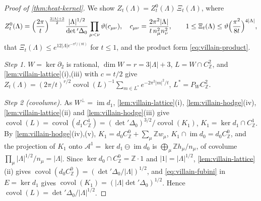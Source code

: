 \documentclass[11pt,a4paper]{amsart}
\theoremstyle{definition}
\theoremstyle{remark}
\numberwithin{equation}{section}
\newcommand{\Z}{\mathbb{Z}}          %
\newcommand{\abs}[1]{\lvert #1\rvert}      %
\begin{document}
\begin{proof}[Proof of \cref{thm:heat-kernel}]
We show $Z_t(\Lambda)=Z^0_t(\Lambda)\,\Xi_t(\Lambda)$, where
\begin{equation}\label{eq:villain-Z0}
Z^0_t(\Lambda)=\Bigl(\frac{2\pi}t\Bigr)^{\frac{3|\Lambda|+3}2}\frac{|\Lambda|^{1/2}}{\det{}'\Delta_0}\prod_{\mu<\nu}\vartheta(c_{\mu\nu}),\quad c_{\mu\nu}=\frac{2\pi^2|\Lambda|}{t\,n_\mu^2n_\nu^2},\qquad 1\le\Xi_t(\Lambda)\le\vartheta\Bigl(\frac{\pi^2}{8t}\Bigr)^{4|\Lambda|},
\end{equation}
that $\Xi_t(\Lambda)\le e^{12|\Lambda|e^{-\pi^2/(8t)}}$ for $t\le1$, and the product form \eqref{eq:villain-product}.

\emph{Step 1.} $W=\ker\partial_2$ is rational, $\dim W=r=3|\Lambda|+3$, $L=W\cap C^2_\Z$, and \cref{lem:villain-lattice}(i),(iii) with $c=t/2$ give $Z_t(\Lambda)=(2\pi/t)^{r/2}\operatorname{covol}(L)^{-1}\sum_{m\in L^*}e^{-2\pi^2\abs m^2/t}$, $L^*=P_WC^2_\Z$.

\emph{Step 2 (covolume).} As $W^\perp=\operatorname{im}d_1$, \cref{lem:villain-lattice}(i), \cref{lem:villain-hodge}(iv), \cref{lem:villain-lattice}(ii) and \cref{lem:villain-hodge}(iii) give $\operatorname{covol}(L)=\operatorname{covol}(d_1C^1_\Z)=(\det{}'\Delta_0)^{3/2}/\operatorname{covol}(K_1)$, $K_1=\ker d_1\cap C^1_\Z$. By \cref{lem:villain-hodge}(iv),(v), $K_1=d_0C^0_\Z+\sum_\mu\Z w_\mu$, $K_1\cap\operatorname{im}d_0=d_0C^0_\Z$, and the projection of $K_1$ onto $\mathcal A^1=\ker d_1\ominus\operatorname{im}d_0$ is $\bigoplus_\mu\Z h_\mu/n_\mu$, of covolume $\prod_\mu|\Lambda|^{1/2}/n_\mu=|\Lambda|$. Since $\ker d_0\cap C^0_\Z=\Z\cdot1$ and $\abs1=|\Lambda|^{1/2}$, \cref{lem:villain-lattice}(ii) gives $\operatorname{covol}(d_0C^0_\Z)=(\det{}'\Delta_0/|\Lambda|)^{1/2}$, and \eqref{eq:villain-fubini} in $E=\ker d_1$ gives $\operatorname{covol}(K_1)=(|\Lambda|\det{}'\Delta_0)^{1/2}$. Hence $\operatorname{covol}(L)=\det{}'\Delta_0/|\Lambda|^{1/2}$.


\end{proof}
\end{document}
